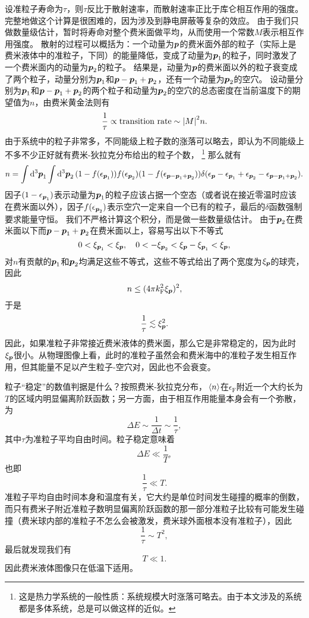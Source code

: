 \documentclass[hyperref, UTF8, a4paper]{ctexart}
\begin{document}
设准粒子寿命为$\tau$，则$\tau$反比于散射速率，而散射速率正比于库仑相互作用的强度。完整地做这个计算是很困难的，因为涉及到静电屏蔽等复杂的效应。
由于我们只做数量级估计，暂时将寿命对整个费米面做平均，从而使用一个常数$M$表示相互作用强度。
散射的过程可以概括为：一个动量为$\vb*{p}$的费米面外部的粒子（实际上是费米液体中的准粒子，下同）的能量降低，变成了动量为$\vb*{p}_1$的粒子，同时激发了一个费米面内的动量为$\vb*{p}_2$的粒子。
结果是，动量为$\vb*{p}$的费米面以外的粒子衰变成了两个粒子，动量分别为$\vb*{p}_1$和$\vb*{p} - \vb*{p}_1 + \vb*{p}_2$，还有一个动量为$\vb*{p}_2$的空穴。
设动量分别为$\vb*{p}_1$和$\vb*{p} - \vb*{p}_1 + \vb*{p}_2$的两个粒子和动量为$\vb*{p}_2$的空穴的总态密度在当前温度下的期望值为$n$，由费米黄金法则有
\[
    \frac{1}{\tau} \propto \text{transition rate} \sim \abs{M}^2 n.
\]
由于系统中的粒子非常多，不同能级上粒子数的涨落可以略去，即认为不同能级上不多不少正好就有费米-狄拉克分布给出的粒子个数，%
\footnote{这是热力学系统的一般性质：系统规模大时涨落可略去。由于本文涉及的系统都是多体系统，总是可以做这样的近似。}%
那么就有
\[
    n = \int \dd[3]{\vb*{p}_1} \int \dd[3]{\vb*{p}_2} (1 - f(\epsilon_{\vb*{p}_1})) f(\epsilon_{\vb*{p}_2}) (1 - f(\epsilon_{\vb*{p} - \vb*{p}_1 + \vb*{p}_2})) \delta(\epsilon_{\vb*{p}} - \epsilon_{\vb*{p}_1} + \epsilon_{\vb*{p}_2} - \epsilon_{\vb*{p} - \vb*{p}_1 + \vb*{p}_2}).
\]
因子$(1-\epsilon_{\vb*{p}_1})$表示动量为$\vb*{p}_1$的粒子应该占据一个空态（或者说在接近零温时应该在费米面以外），因子$f(\epsilon_{\vb*{p}_2})$表示空穴一定来自一个已有的粒子，最后的$\delta$函数强制要求能量守恒。
我们不严格计算这个积分，而是做一些数量级估计。
由于$\vb*{p}_2$在费米面以下而$\vb*{p}- \vb*{p}_1 + \vb*{p}_2$在费米面以上，容易写出以下不等式
\[
    0 < \xi_{\vb*{p}_1} < \xi_{\vb*{p}}, \quad 0 < - \xi_{\vb*{p}_2} < \xi_{\vb*{p}} - \xi_{\vb*{p}_1} < \xi_{\vb*{p}},
\]
对$n$有贡献的$\vb*{p}_1$和$\vb*{p}_2$均满足这些不等式，这些不等式给出了两个宽度为$\xi_{\vb*{p}}$的球壳，因此
\[
    n \leq (4 \pi k_\text{F}^2 \xi_{\vb*{p}})^2,
\]
于是
\begin{equation}
    \frac{1}{\tau} \lesssim \xi_{\vb*{p}}^2.
\end{equation}
因此，如果准粒子非常接近费米液体的费米面，那么它是非常稳定的，因为此时$\xi_{\vb*{p}}$很小。从物理图像上看，此时的准粒子虽然会和费米海中的准粒子发生相互作用，但其能量不足以产生粒子-空穴对，因此也不会衰变。

粒子“稳定”的数值判据是什么？按照费米-狄拉克分布，$\expval*{{n}}$在$\epsilon_\text{F}$附近一个大约长为$T$的区域内明显偏离阶跃函数；另一方面，由于相互作用能量本身会有一个弥散，为
\[
    \Delta E \sim \frac{1}{\Delta t} \sim \frac{1}{\tau},
\]
其中$\tau$为准粒子平均自由时间。粒子稳定意味着
\[
    \Delta E \ll \frac{1}{T},
\]
也即
\[
    \frac{1}{\tau} \ll T.
\]
准粒子平均自由时间本身和温度有关，它大约是单位时间发生碰撞的概率的倒数，而只有费米子附近准粒子数明显偏离阶跃函数的那一部分准粒子比较有可能发生碰撞（费米球内部的准粒子不怎么会被激发，费米球外面根本没有准粒子），因此
\[
    \frac{1}{\tau} \sim T^2,
\]
最后就发现我们有
\[
    T \ll 1.
\]
因此费米液体图像只在低温下适用。
\end{document}
